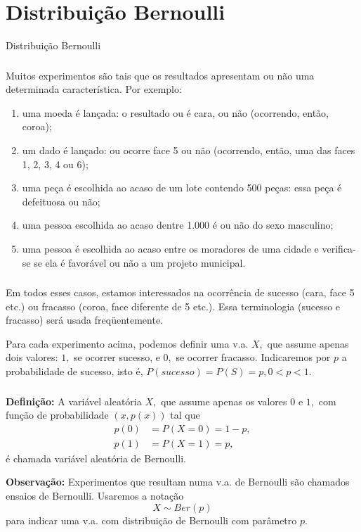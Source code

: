 \documentclass[14pt,aspectratio=1610]{beamer}
\begin{document}
\section{Distribuição Bernoulli}
\begin{frame}{Distribuição Bernoulli}
\frametitle{}
\begin{block}{}
\justifying
Muitos experimentos são tais que os resultados apresentam ou não uma determinada
característica. Por exemplo:
\begin{enumerate}
\item uma moeda é lançada: o resultado ou é cara, ou não (ocorrendo, então, coroa); \pause
\item um dado é lançado: ou ocorre face 5 ou não (ocorrendo, então, uma das faces
1, 2, 3, 4 ou 6);\pause
\item uma peça é escolhida ao acaso de um lote contendo 500 peças: essa peça é
defeituosa ou não;\pause
\item uma pessoa escolhida ao acaso dentre 1.000 é ou não do sexo masculino;\pause
\item uma pessoa é escolhida ao acaso entre os moradores de uma cidade e verifica-se
se ela é favorável ou não a um projeto municipal.
\end{enumerate}
\end{block}
\end{frame}

\begin{frame}{}
\frametitle{}
\begin{block}{}
\justifying
Em todos esses casos, estamos interessados na ocorrência de sucesso (cara, face 5
etc.) ou fracasso (coroa, face diferente de 5 etc.). Essa terminologia (sucesso e fracasso) será usada freqüentemente.
\end{block}
\pause
\begin{block}{}
\justifying
Para cada experimento acima, podemos definir uma v.a. $X,$ que assume apenas
dois valores: $1,$ se ocorrer sucesso, e $0,$ se ocorrer fracasso. Indicaremos por $p$ a probabilidade de sucesso, isto é, $P(sucesso) = P(S) = p, 0 < p < 1.$
\end{block}
\end{frame}

\begin{frame}{}
\frametitle{}
\begin{block}{}
\justifying
{\bf Definição:} A variável aleatória $X,$ que assume apenas os valores $0$ e $1,$ com função de probabilidade $(x, p(x))$ tal que
\begin{align*}
p(0) &= P(X = 0) = 1 - p,\\
p(1) &= P(X = 1) = p,
\end{align*}
é chamada variável aleatória de Bernoulli.
\end{block}
\pause
\begin{block}{}
\justifying
{\bf Observação:} Experimentos que resultam numa v.a. de Bernoulli são chamados ensaios de Bernoulli. Usaremos a notação $$X\sim Ber(p)$$
para indicar uma v.a. com distribuição de Bernoulli com parâmetro $p.$
\end{block}
\end{frame}
\end{document}
